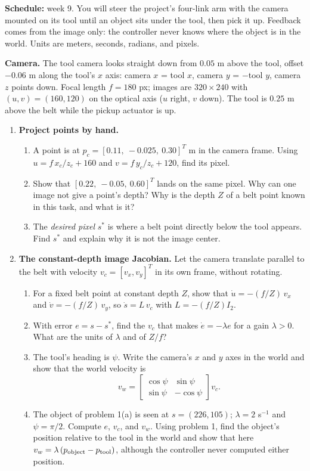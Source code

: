 

\textbf{Schedule:} week 9. You will steer the project's four-link arm with
the camera mounted on its tool until an object sits under the tool, then
pick it up. Feedback comes from the image only: the controller never knows
where the object is in the world. Units are meters, seconds, radians, and
pixels.

\textbf{Camera.} The tool camera looks straight down from $0.05$ m above
the tool, offset $-0.06$ m along the tool's $x$ axis: camera $x$ = tool $x$,
camera $y$ = $-$tool $y$, camera $z$ points down. Focal length $f=180$ px;
images are $320\times240$ with $(u,v)=(160,120)$ on the optical axis ($u$
right, $v$ down). The tool is $0.25$ m above the belt while the pickup
actuator is up.

\begin{enumerate}
\item \textbf{Project points by hand.}
\begin{enumerate}
\item A point is at $p_c=[0.11,\ -0.025,\ 0.30]^T$ m in the camera frame.
Using $u=f\,x_c/z_c+160$ and $v=f\,y_c/z_c+120$, find its pixel.
\item Show that $[0.22,\ -0.05,\ 0.60]^T$ lands on the same pixel. Why can
one image not give a point's depth? Why is the depth $Z$ of a belt point
known in this task, and what is it?
\item The \emph{desired pixel} $s^*$ is where a belt point directly below the
tool appears. Find $s^*$ and explain why it is not the image center.
\end{enumerate}

\item \textbf{The constant-depth image Jacobian.}
Let the camera translate parallel to the belt with velocity
$v_c=[v_x,v_y]^T$ in its own frame, without rotating.
\begin{enumerate}
\item For a fixed belt point at constant depth $Z$, show that
$\dot u=-(f/Z)\,v_x$ and $\dot v=-(f/Z)\,v_y$, so $\dot s=L\,v_c$ with
$L=-(f/Z)I_2$.
\item With error $e=s-s^*$, find the $v_c$ that makes $\dot e=-\lambda e$
for a gain $\lambda>0$. What are the units of $\lambda$ and of $Z/f$?
\item The tool's heading is $\psi$. Write the camera's $x$ and $y$ axes in
the world and show that the world velocity is
\[
v_w=\begin{bmatrix}\cos\psi&\sin\psi\\ \sin\psi&-\cos\psi\end{bmatrix}v_c .
\]
\item The object of problem 1(a) is seen at $s=(226,105)$; $\lambda=2$
s$^{-1}$ and $\psi=\pi/2$. Compute $e$, $v_c$, and $v_w$. Using problem 1,
find the object's position relative to the tool in the world and show
that here $v_w=\lambda\,(p_{\rm object}-p_{\rm tool})$, although the
controller never computed either position.
\end{enumerate}
\end{enumerate}

